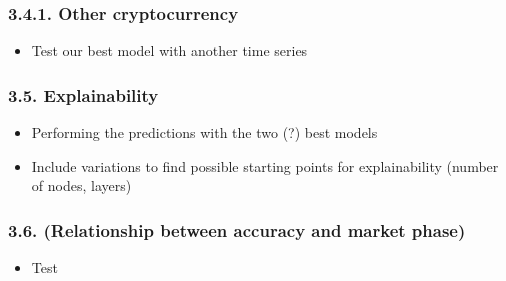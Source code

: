 \documentclass[
]{article}
\providecommand{\tightlist}{%
  \setlength{\itemsep}{0pt}\setlength{\parskip}{0pt}}
\begin{document}
\hypertarget{other-cryptocurrency}{%
\subsubsection{3.4.1. Other cryptocurrency}\label{other-cryptocurrency}}

\begin{itemize}
\tightlist
\item
  Test our best model with another time series
\end{itemize}

\hypertarget{explainability}{%
\subsubsection{3.5. Explainability}\label{explainability}}

\begin{itemize}
\item
  Performing the predictions with the two (?) best models
\item
  Include variations to find possible starting points for explainability
  (number of nodes, layers)
\end{itemize}

\hypertarget{relationship-between-accuracy-and-market-phase}{%
\subsubsection{3.6. (Relationship between accuracy and market
phase)}\label{relationship-between-accuracy-and-market-phase}}

\begin{itemize}
\tightlist
\item
  Test
\end{itemize}
\end{document}
